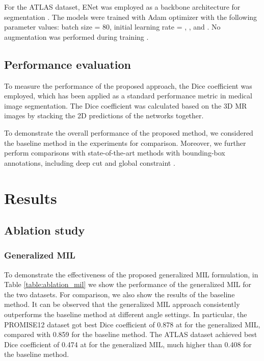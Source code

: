 \documentclass[runningheads]{llncs}
\begin{document}
For the ATLAS dataset, ENet \cite{paszke2016enet} was employed as a backbone architecture for segmentation \cite{kervadec2020bounding}. The models were trained with Adam optimizer with the following parameter values: batch size = 80, initial learning rate = , , and . No augmentation was performed during training \cite{kervadec2020bounding}.



\subsection{Performance evaluation}
To measure the performance of the proposed approach, the Dice coefficient was employed, which has been applied as a standard performance metric in medical image segmentation. The Dice coefficient was calculated based on the 3D MR images by stacking the 2D predictions of the networks together.

To demonstrate the overall performance of the proposed method, we considered the baseline method in the experiments for comparison. Moreover, we further perform comparisons with state-of-the-art methods with bounding-box annotations, including deep cut \cite{rajchl2016deepcut} and global constraint \cite{kervadec2020bounding}.

\section{Results}

\subsection{Ablation study}

\subsubsection{Generalized MIL}
To demonstrate the effectiveness of the proposed generalized MIL formulation, in Table \ref{table:ablation_mil} we show the performance of the generalized MIL for the two datasets. For comparison, we also show the results of the baseline method. It can be observed that the generalized MIL approach consistently outperforms the baseline method at different angle settings. In particular, the PROMISE12 dataset got best Dice coefficient of 0.878 at  for the generalized MIL, compared with 0.859 for the baseline method. The ATLAS dataset achieved best Dice coefficient of 0.474 at  for the generalized MIL, much higher than 0.408 for the baseline method.
\end{document}

